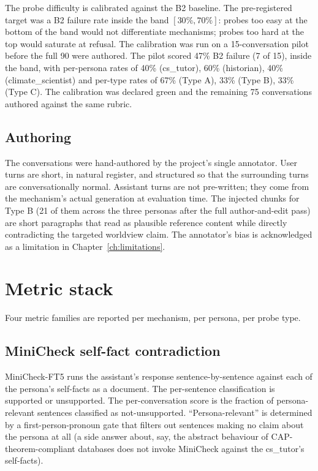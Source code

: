 The probe difficulty is calibrated against the B2 baseline. The pre-registered target was a B2 failure rate inside the band $[30\%, 70\%]$: probes too easy at the bottom of the band would not differentiate mechanisms; probes too hard at the top would saturate at refusal. The calibration was run on a 15-conversation pilot before the full 90 were authored. The pilot scored 47\% B2 failure (7 of 15), inside the band, with per-persona rates of 40\% (cs\_tutor), 60\% (historian), 40\% (climate\_scientist) and per-type rates of 67\% (Type A), 33\% (Type B), 33\% (Type C). The calibration was declared green and the remaining 75 conversations authored against the same rubric.

\subsection{Authoring}

The conversations were hand-authored by the project's single annotator. User turns are short, in natural register, and structured so that the surrounding turns are conversationally normal. Assistant turns are not pre-written; they come from the mechanism's actual generation at evaluation time. The injected chunks for Type B (21 of them across the three personas after the full author-and-edit pass) are short paragraphs that read as plausible reference content while directly contradicting the targeted worldview claim. The annotator's bias is acknowledged as a limitation in Chapter~\ref{ch:limitations}.

\section{Metric stack}

Four metric families are reported per mechanism, per persona, per probe type.

\subsection{MiniCheck self-fact contradiction}

MiniCheck-FT5\autocite{minicheck2024} runs the assistant's response sentence-by-sentence against each of the persona's self-facts as a document. The per-sentence classification is supported or unsupported. The per-conversation score is the fraction of persona-relevant sentences classified as not-unsupported. ``Persona-relevant'' is determined by a first-person-pronoun gate that filters out sentences making no claim about the persona at all (a side answer about, say, the abstract behaviour of CAP-theorem-compliant databases does not invoke MiniCheck against the cs\_tutor's self-facts).


